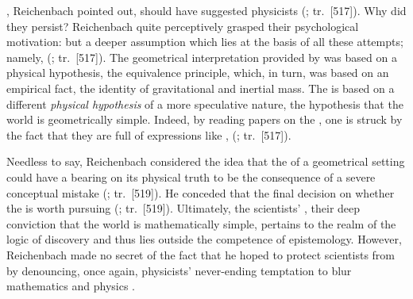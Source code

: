 \documentclass[final]{article}
\renewcommand{\rzlap}[2]{(\cite[#1]{Reichenbach1928}; tr.\ [#2])\xspace}
\begin{document}
, Reichenbach pointed out, should have suggested physicists  \rzlap{370}{517}. Why did they persist? Reichenbach quite perceptively grasped their psychological motivation:  but a deeper assumption which lies at the basis of all these attempts; namely,  \rzlap{370}{517}. The geometrical interpretation provided by \gr was based on a physical hypothesis, the equivalence principle, which, in turn, was based on an empirical fact, the identity of gravitational and inertial mass. The \uftp is based on a different \emph{physical hypothesis} of a more speculative nature, the hypothesis that the world is geometrically simple. Indeed, by reading papers on the \uft, one is struck by the fact that they are full of expressions like , \etc \rzlap{370}{517}.

Needless to say, Reichenbach considered the idea that the  of a geometrical setting could have a bearing on its physical truth to be the consequence of a severe conceptual mistake \rzlap{372}{519}. He conceded that the final decision on whether the \uftp is worth pursuing  \rzlap{372}{519}. Ultimately, the scientists' , their deep conviction that the world is mathematically simple, pertains to the realm of the logic of discovery and thus lies outside the competence of epistemology. However, Reichenbach made no secret of the fact that he hoped to protect scientists from  by denouncing, once again, physicists' never-ending temptation to blur mathematics and physics \citep[373]{Reichenbach1928}.
\end{document}
